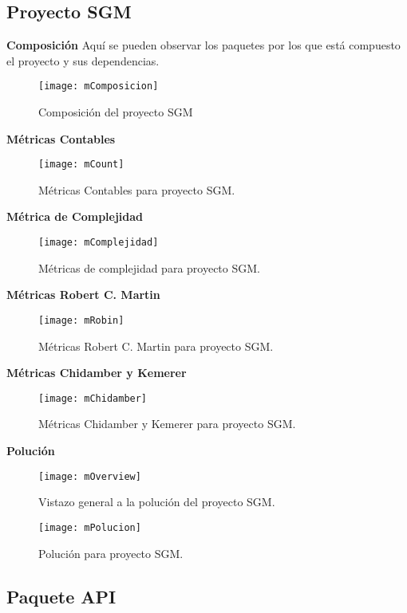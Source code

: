 \subsection{Proyecto SGM}

\textbf{Composición}
Aquí se pueden observar los paquetes por los que está compuesto el proyecto y sus dependencias.

\begin{figure}[H]
	\centering
	\texttt{[image: mComposicion]}
	\centering
	\caption{Composición del proyecto SGM}
	\label{fig:mComposicion}
\end{figure}
\textbf{Métricas Contables}
\begin{figure}[H]
	\centering
	\texttt{[image: mCount]}
	\centering
	\caption{Métricas Contables para proyecto SGM.}
	\label{fig:mCount}
\end{figure}

\clearpage

\textbf{Métrica de Complejidad}
\begin{figure}[H]
	\centering
	\texttt{[image: mComplejidad]}
	\centering
	\caption{Métricas de complejidad para proyecto SGM.}
	\label{fig:mComplejidad}
\end{figure}

\textbf{Métricas Robert C. Martin}
\begin{figure}[H]
	\centering
	\texttt{[image: mRobin]}
	\centering
	\caption{Métricas Robert C. Martin para proyecto SGM.}
	\label{fig:mRobin}
\end{figure}
\textbf{Métricas Chidamber y Kemerer}
\begin{figure}[H]
	\centering
	\texttt{[image: mChidamber]}
	\centering
	\caption{Métricas Chidamber y Kemerer para proyecto SGM.}
	\label{fig:mChidamber}
\end{figure}
\clearpage
\textbf{Polución}
\begin{figure}[H]
	\centering
	\texttt{[image: mOverview]}
	\centering
	\caption{Vistazo general a la polución del proyecto SGM.}
	\label{fig:mOverview}
\end{figure}
\begin{figure}[H]
	\centering
	\texttt{[image: mPolucion]}
	\centering
	\caption{Polución para proyecto SGM.}
	\label{fig:mChidamber}
\end{figure}
\newpage
\subsection{Paquete API}

